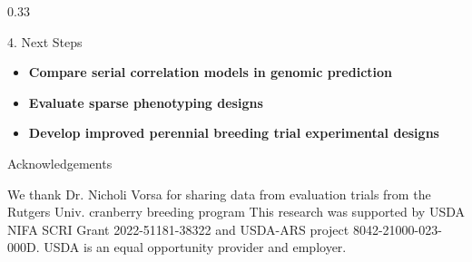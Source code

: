 \documentclass[final]{beamer}
\newlength{\twocolwid}
\begin{document}
\begin{frame}[t]
\begin{columns}[t]
\begin{column}{\twocolwid}
\begin{columns}[t,totalwidth=\twocolwid]
\begin{column}{0.33\twocolwid}

\vspace{4cm}

\begin{alertblock}{\Large{4. Next Steps}}

\begin{footnotesize}
\begin{itemize}
  \item \textbf{Compare serial correlation models in genomic prediction}
  \vspace{0.5cm}
  \item \textbf{Evaluate sparse phenotyping designs}
  \vspace{0.5cm}
  \item \textbf{Develop improved perennial breeding trial experimental designs}
\end{itemize}
\end{footnotesize}


\end{alertblock}








\begin{block}{\large{Acknowledgements}}
\vspace{-2cm}

\begin{footnotesize}

We thank Dr. Nicholi Vorsa for sharing data from evaluation trials from the Rutgers Univ. cranberry breeding program This research was supported by USDA NIFA SCRI Grant 2022-51181-38322 and USDA-ARS project 8042-21000-023-000D. USDA is an equal opportunity provider and employer.

\end{footnotesize}

\end{block}




\end{column}
\end{columns}
\end{column}
\end{columns}
\end{frame}
\end{document}

